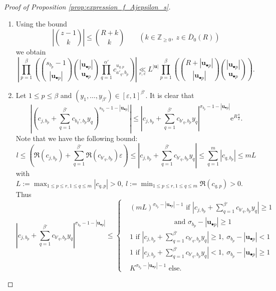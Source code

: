 \documentclass[a4paper]{amsart}
\theoremstyle{remark}
\theoremstyle{definition}
\newcommand{\phie}{\mathrm{e}}
\begin{document}
\begin{proof}[Proof of Proposition \ref{prop:expression_f_Ajepsilon_s}]
\begin{enumerate}
\item[$\bullet$] Using the bound
$$ \left| \binom{z-1}{k} \right| \leq \binom{R+k}{k} \qquad (k \in \mathbb{Z}_{\geq 0}, \ z \in \overline{D}_0(R)) $$ 
we obtain
\begin{equation}
    \left| \prod_{p=1}^{\beta} \left( \binom{s_{b_p}-1}{|\mathbf{u}_{\bullet p}|} \binom{|\mathbf{u}_{\bullet p}|}{\mathbf{u}_{\bullet p}} \prod_{q=1}^{\alpha'} c_{a'_q,b_p}^{u_{q,p}} \right) \right| \underset{r,\varepsilon}{\ll} L^{|\mathbf{u}|} \prod_{p=1}^{\beta} \left( \binom{R+|\mathbf{u}_{\bullet p}|}{|\mathbf{u}_{\bullet p}|} \binom{|\mathbf{u}_{\bullet p}|}{\mathbf{u}_{\bullet p}} \right). \label{eq:bound_multinomial}
\end{equation}

\item[$\bullet$] Let $1 \leq p \leq \beta$ and $(y_1,\ldots,y_{\beta'}) \in [\varepsilon,1]^{\beta'}$. It is clear that
$$ \left|\left( c_{j,b_p}+\sum_{q=1}^{\beta'} c_{b_q',b_p} y_{q} \right)^{s_{b_p}-1-|\mathbf{u}_{\bullet p}|}\right| \leq \left|c_{j,b_p}+\sum_{q=1}^{\beta'} c_{b'_q,b_p} y_q \right|^{\sigma_{b_p}-1-|\mathbf{u}_{\bullet p}|} \phie^{R \frac{\pi}{2}}. $$
Note that we have the following bound:
$$ l \leq \left( \Re(c_{j,b_p})+\sum_{q=1}^{\beta'} \Re(c_{b'_q,b_p}) \varepsilon \right) \leq \left| c_{j,b_p}+\sum_{q=1}^{\beta'} c_{b'_q,b_p} y_{q} \right| \leq \sum_{q=1}^{m} |c_{q,b_p}| \leq mL $$ 
with $L := \max_{1 \leq p \leq r, 1 \leq q \leq m}|c_{q,p}|>0, \ l := \min_{1 \leq p \leq r, 1 \leq q \leq m}{\Re(c_{q,p})}>0$. Thus
\[
    \left| c_{j,b_p}+\sum_{q=1}^{\beta'} c_{b'_q,b_p} y_{q} \right|^{\sigma_{b_p}-1-|\mathbf{u}_{\bullet p}|} \leq \left\{
    \begin{aligned}
        & (mL)^{\sigma_{b_p}-|\mathbf{u}_{\bullet p}|-1} \text{ if } \left|c_{j,b_p}+\sum_{q=1}^{\beta'} c_{b'_q,b_p} y_q \right| \geq 1 \\
        & \qquad \qquad \qquad \text{ and } \sigma_{b_p}-|\mathbf{u}_{\bullet p}| \geq 1 \\
        & 1 \text{ if } \left|c_{j,b_p}+\sum_{q=1}^{\beta'} c_{b'_q,b_p} y_q \right| \geq 1, \ \sigma_{b_p}-|\mathbf{u}_{\bullet p}| < 1 \\
        & 1 \text{ if } \left|c_{j,b_p}+\sum_{q=1}^{\beta'} c_{b'_q,b_p} y_q \right| < 1, \ \sigma_{b_p}-|\mathbf{u}_{\bullet p}| \geq 1 \\
        & K^{\sigma_{b_p}-|\mathbf{u}_{\bullet p}|-1} \text{ else}.
    \end{aligned}
    \right. 
\]


\end{enumerate}
\end{proof}
\end{document}
